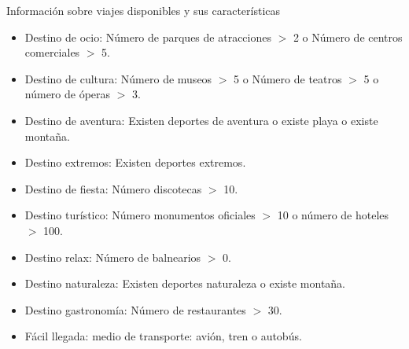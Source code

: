 \documentclass[11pt, a4paper, spanish, openright, twoside]{book}
\begin{document}
\begin{section}{Información sobre viajes disponibles y sus características}
				\begin{itemize}
					\item Destino de ocio: Número de parques de atracciones $>$ 2 o Número de centros comerciales $>$ 5.
					\item Destino de cultura: Número de museos $>$ 5 o Número de teatros $>$ 5 o número de óperas $>$ 3.
					\item Destino de aventura: Existen deportes de aventura o existe playa o existe montaña.
					\item Destino extremos: Existen deportes extremos.
					\item Destino de fiesta: Número discotecas $>$ 10.
					\item Destino turístico: Número monumentos oficiales $>$ 10 o número de hoteles $>$ 100.
					\item Destino relax: Número de balnearios $>$ 0.
					\item Destino naturaleza: Existen deportes naturaleza o existe montaña.
					\item Destino gastronomía: Número de restaurantes $>$ 30.
					\item Fácil llegada: medio de transporte: avión, tren o autobús.
					
					
				\end{itemize}
		
	\end{section}
\end{document}
